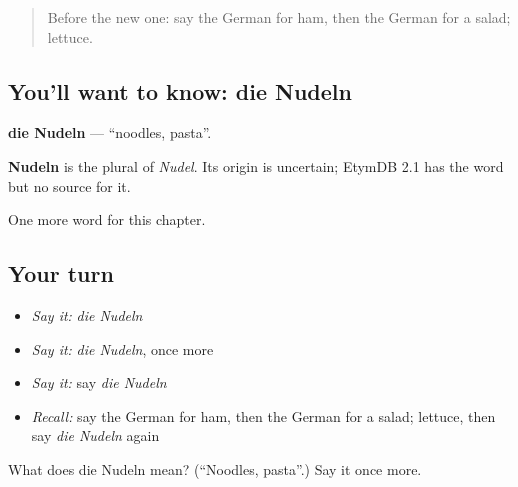 \begin{quote}
Before the new one: say the German for ham, then the German for a salad; lettuce.
\end{quote}

\subsection*{You'll want to know: die Nudeln}
\textbf{die Nudeln} — \textquotedblleft{}noodles, pasta\textquotedblright{}.

\begin{cousinweb}
\textbf{Nudeln} is the plural of \emph{Nudel}. Its origin is uncertain; EtymDB 2.1 has the word but no source for it.
\end{cousinweb}

\begin{grammarlens}[title={What you've built}]
One more word for this chapter.
\end{grammarlens}

\subsection*{Your turn}
\begin{itemize}
\raggedright
  \item \emph{Say it:} \emph{die Nudeln}
  \item \emph{Say it:} \emph{die Nudeln}, once more
  \item \emph{Say it:} say \emph{die Nudeln}
  \item \emph{Recall:} say the German for ham, then the German for a salad; lettuce, then say \emph{die Nudeln} again
\end{itemize}

\begin{tcolorbox}[breakable,colback=teal!4,colframe=teal!35!black,title={Before you move on}]
What does die Nudeln mean? (\textquotedblleft{}Noodles, pasta\textquotedblright{}.) Say it once more.
\end{tcolorbox}
